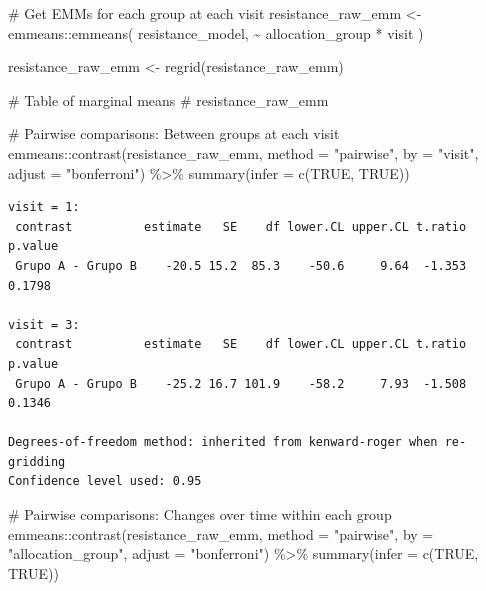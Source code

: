 \documentclass[
  12pt,
]{article}
\newenvironment{Shaded}{\begin{snugshade}}{\end{snugshade}}
\newcommand{\AttributeTok}[1]{\textcolor[rgb]{0.40,0.45,0.13}{#1}}
\newcommand{\CommentTok}[1]{\textcolor[rgb]{0.37,0.37,0.37}{#1}}
\newcommand{\ConstantTok}[1]{\textcolor[rgb]{0.56,0.35,0.01}{#1}}
\newcommand{\FunctionTok}[1]{\textcolor[rgb]{0.28,0.35,0.67}{#1}}
\newcommand{\NormalTok}[1]{\textcolor[rgb]{0.00,0.23,0.31}{#1}}
\newcommand{\OtherTok}[1]{\textcolor[rgb]{0.00,0.23,0.31}{#1}}
\newcommand{\SpecialCharTok}[1]{\textcolor[rgb]{0.37,0.37,0.37}{#1}}
\newcommand{\StringTok}[1]{\textcolor[rgb]{0.13,0.47,0.30}{#1}}
\begin{document}
\begin{Shaded}
\begin{Highlighting}[]
\CommentTok{\# Get EMMs for each group at each visit}
\NormalTok{resistance\_raw\_emm }\OtherTok{\textless{}{-}}\NormalTok{ emmeans}\SpecialCharTok{::}\FunctionTok{emmeans}\NormalTok{(}
\NormalTok{    resistance\_model, }
    \SpecialCharTok{\textasciitilde{}}\NormalTok{ allocation\_group }\SpecialCharTok{*}\NormalTok{ visit}
\NormalTok{)}

\NormalTok{resistance\_raw\_emm }\OtherTok{\textless{}{-}} \FunctionTok{regrid}\NormalTok{(resistance\_raw\_emm)}

\CommentTok{\# Table of marginal means}
\CommentTok{\# resistance\_raw\_emm}

\CommentTok{\# Pairwise comparisons: Between groups at each visit}
\NormalTok{emmeans}\SpecialCharTok{::}\FunctionTok{contrast}\NormalTok{(resistance\_raw\_emm,}
\AttributeTok{method =} \StringTok{"pairwise"}\NormalTok{, }\AttributeTok{by =} \StringTok{"visit"}\NormalTok{,}
\AttributeTok{adjust =} \StringTok{"bonferroni"}\NormalTok{) }\SpecialCharTok{\%\textgreater{}\%} \FunctionTok{summary}\NormalTok{(}\AttributeTok{infer =} \FunctionTok{c}\NormalTok{(}\ConstantTok{TRUE}\NormalTok{, }\ConstantTok{TRUE}\NormalTok{))}
\end{Highlighting}
\end{Shaded}

\begin{verbatim}
visit = 1:
 contrast          estimate   SE    df lower.CL upper.CL t.ratio p.value
 Grupo A - Grupo B    -20.5 15.2  85.3    -50.6     9.64  -1.353  0.1798

visit = 3:
 contrast          estimate   SE    df lower.CL upper.CL t.ratio p.value
 Grupo A - Grupo B    -25.2 16.7 101.9    -58.2     7.93  -1.508  0.1346

Degrees-of-freedom method: inherited from kenward-roger when re-gridding 
Confidence level used: 0.95 
\end{verbatim}

\begin{Shaded}
\begin{Highlighting}[]
\CommentTok{\# Pairwise comparisons: Changes over time within each group}
\NormalTok{emmeans}\SpecialCharTok{::}\FunctionTok{contrast}\NormalTok{(resistance\_raw\_emm,}
\AttributeTok{method =} \StringTok{"pairwise"}\NormalTok{, }\AttributeTok{by =} \StringTok{"allocation\_group"}\NormalTok{,}
\AttributeTok{adjust =} \StringTok{"bonferroni"}\NormalTok{) }\SpecialCharTok{\%\textgreater{}\%} \FunctionTok{summary}\NormalTok{(}\AttributeTok{infer =} \FunctionTok{c}\NormalTok{(}\ConstantTok{TRUE}\NormalTok{, }\ConstantTok{TRUE}\NormalTok{))}
\end{Highlighting}
\end{Shaded}
\end{document}
